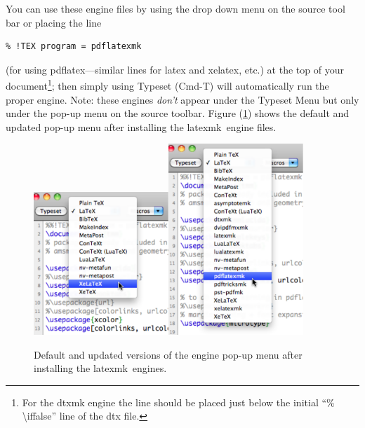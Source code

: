 \documentclass[11pt]{article}
\newcommand{\cmdkey}{\textsf{Cmd}}
\newcommand{\mnu}[1]{\textsf{#1}}
\newcommand{\cmd}[1]{\textsf{#1}}
\newcommand{\latexmk}{\textsf{latexmk}}
\begin{document}
You can use these \cmd{engine} files by using the drop down menu on the source tool bar or placing the line
\begin{verbatim}
% !TEX program = pdflatexmk
\end{verbatim}
(for using \cmd{pdflatex}---similar lines for \cmd{latex} and \cmd{xelatex}, etc.) at the top of your document\footnote{For the dtxmk engine the line should be placed just below the initial ``\cmd{\% \textbackslash iffalse}'' line of the \cmd{dtx} file.}; then simply using \mnu{Typeset} (\cmd{\cmdkey-T}) will automatically run the proper \cmd{engine}. Note: these engines \emph{don't} appear under the \mnu{Typeset} Menu but only under the pop-up menu on the source toolbar. Figure (\ref{fig:popupmenus}) shows the default and updated pop-up menu after installing the \latexmk\ engine files.
\begin{figure}
\centering
\includegraphics[width=2in]{figs/OriginalTypesetPopup}\qquad\includegraphics[width=2in]{figs/UpdatedTypesetPopup}
\caption{Default and updated versions of the engine pop-up menu after installing the \latexmk\ engines.}\label{fig:popupmenus}
\end{figure}

\end{document}
